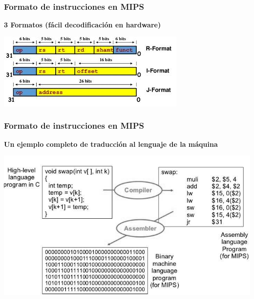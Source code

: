 \documentclass[aspectratio=169,compress]{beamer}
\begin{document}
\begin{footnotesize}
\begin{frame}
\begin{tabular}{cl}
\end{tabular}
\end{frame}


\begin{frame}
\frametitle{Formato de  instrucciones en MIPS}
	\textbf{3 Formatos (fácil decodificación en hardware)}
	\begin{center}
\includegraphics[scale=0.5]{images/formato.jpg} 
	\end{center}
\end{frame}


\begin{frame}
\frametitle{Formato de instrucciones en MIPS}
	\textbf{Un ejemplo completo de traducción al lenguaje de la máquina}
	\begin{center}
\includegraphics[scale=0.4]{images/below2.jpg} 
	\end{center}
\end{frame}






\end{footnotesize}
\end{document}
